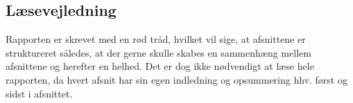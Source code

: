 \subsection{Læsevejledning}
Rapporten er skrevet med en rød tråd, hvilket vil sige, at afsnittene er struktureret således, at der gerne skulle skabes en sammenhæng mellem afsnittene og herefter en helhed. Det er dog ikke nødvendigt at læse hele rapporten, da hvert afsnit har sin egen indledning og opsummering hhv. først og sidst i afsnittet.




